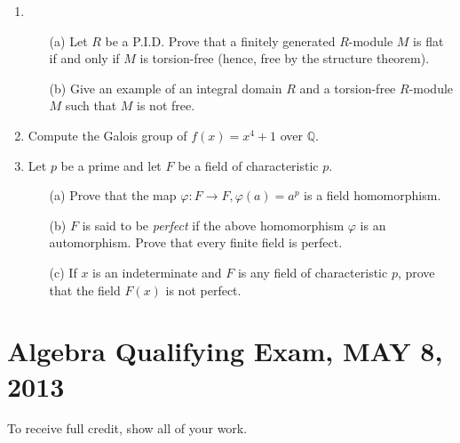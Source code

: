 \documentclass{article}
\begin{document}
\begin{enumerate}
    \item 
    \begin{itemize}
        \item[(a)] Let \(R\) be a P.I.D. Prove that a finitely generated \(R\)-module \(M\) is flat if and only if \(M\) is torsion-free (hence, free by the structure theorem).
        \item[(b)] Give an example of an integral domain \(R\) and a torsion-free \(R\)-module \(M\) such that \(M\) is not free.
    \end{itemize}

    \item Compute the Galois group of \(f(x) = x^4 + 1\) over \(\mathbb{Q}\).

    \item Let \(p\) be a prime and let \(F\) be a field of characteristic \(p\).
    \begin{itemize}
        \item[(a)] Prove that the map \(\varphi : F \to F, \varphi(a) = a^p\) is a field homomorphism.
        \item[(b)] \(F\) is said to be \textit{perfect} if the above homomorphism \(\varphi\) is an automorphism. Prove that every finite field is perfect.
        \item[(c)] If \(x\) is an indeterminate and \(F\) is any field of characteristic \(p\), prove that the field \(F(x)\) is not perfect.
    \end{itemize}
\end{enumerate}

\section*{Algebra Qualifying Exam, MAY 8, 2013}

To receive full credit, show all of your work.
\end{document}
